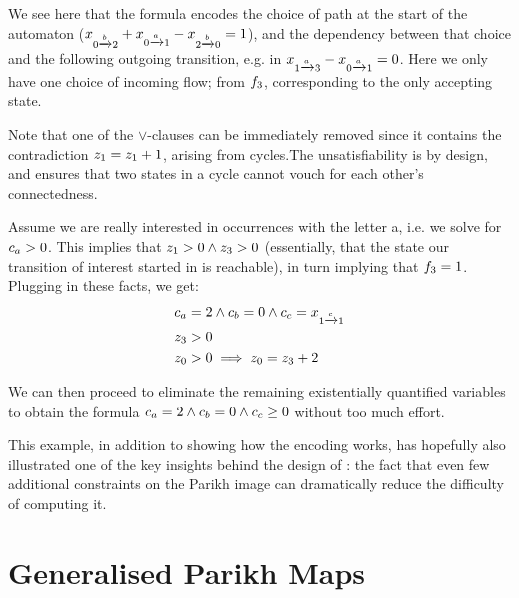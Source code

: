 \documentclass[acmsmall,review,anonymous,screen]{acmart}\settopmatter{printfolios=true,printccs=false,printacmref=true}
\theoremstyle{definition}
\begin{document}
  We see here that the formula encodes the choice of path at the start of the
  automaton ($x_{0 \xrightarrow{b} 2} +
  x_{0 \xrightarrow{a} 1} -
  x_{2 \xrightarrow{b} 0} = 1$), and the dependency between that
  choice and the following outgoing transition, e.g. in
  $x_{1 \xrightarrow{a} 3} -
  x_{0 \xrightarrow{a} 1} = 0$. Here we only have one choice of
  incoming flow; from $f_3$, corresponding to the only accepting
  state.


Note that one of the $\lor$-clauses can be immediately removed since it contains
the contradiction $z_{1} = z_{1} + 1$, arising from cycles.The
unsatisfiability is by design, and ensures that two states in a cycle cannot
vouch for each other's connectedness.

Assume we are really interested in occurrences with the letter a, i.e. we solve
for $c_a > 0$. This implies that $z_{1} > 0 \land z_{3}
> 0$ (essentially, that the state our transition of interest started in is
reachable), in turn implying that $f_3 = 1$. Plugging in these
facts, we get:
\begin{equation}
  \begin{aligned}
  &c_{a} = 2 \land c_{b} = 0 \land c_{c} = x_{1 \xrightarrow{c} 1}\\
  & z_{3} > 0\\
  &z_{0} > 0 \implies z_{0} = z_{3} + 2\\
  \end{aligned}
  \label{eq:parikh-formula-calc}
  \end{equation}

We can then proceed to eliminate the remaining existentially quantified
variables to obtain the formula $c_{a} = 2 \land c_{b} = 0
\land c_{c} \geq 0$ without too much effort.

  This example, in addition to showing how the encoding works, has hopefully
  also illustrated one of the key insights behind the design of \Calculus: the
  fact that even few additional constraints on the Parikh image can dramatically
  reduce the difficulty of computing it.

  
\section{Generalised Parikh Maps}\label{sec:generalised}
\end{document}

